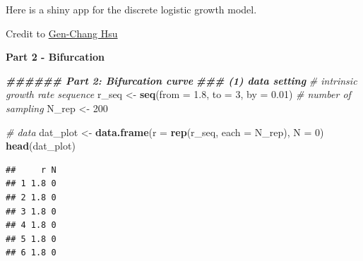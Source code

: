 \documentclass[
]{book}
\newenvironment{Shaded}{\begin{snugshade}}{\end{snugshade}}
\newcommand{\AttributeTok}[1]{\textcolor[rgb]{0.13,0.29,0.53}{#1}}
\newcommand{\CommentTok}[1]{\textcolor[rgb]{0.56,0.35,0.01}{\textit{#1}}}
\newcommand{\DecValTok}[1]{\textcolor[rgb]{0.00,0.00,0.81}{#1}}
\newcommand{\DocumentationTok}[1]{\textcolor[rgb]{0.56,0.35,0.01}{\textbf{\textit{#1}}}}
\newcommand{\FloatTok}[1]{\textcolor[rgb]{0.00,0.00,0.81}{#1}}
\newcommand{\FunctionTok}[1]{\textcolor[rgb]{0.13,0.29,0.53}{\textbf{#1}}}
\newcommand{\NormalTok}[1]{#1}
\newcommand{\OtherTok}[1]{\textcolor[rgb]{0.56,0.35,0.01}{#1}}
\begin{document}
Here is a shiny app for the discrete logistic growth model.

Credit to \href{https://genchanghsu.github.io/index.html}{Gen-Chang Hsu}

\textbf{Part 2 - Bifurcation}

\begin{Shaded}
\begin{Highlighting}[]
\DocumentationTok{\#\#\#\#\#\# Part 2: Bifurcation curve}
\DocumentationTok{\#\#\# (1) data setting}
\CommentTok{\# intrinsic growth rate sequence}
\NormalTok{r\_seq }\OtherTok{\textless{}{-}} \FunctionTok{seq}\NormalTok{(}\AttributeTok{from =} \FloatTok{1.8}\NormalTok{, }\AttributeTok{to =} \DecValTok{3}\NormalTok{, }\AttributeTok{by =} \FloatTok{0.01}\NormalTok{)}
\CommentTok{\# number of sampling}
\NormalTok{N\_rep }\OtherTok{\textless{}{-}} \DecValTok{200}

\CommentTok{\# data }
\NormalTok{dat\_plot }\OtherTok{\textless{}{-}} \FunctionTok{data.frame}\NormalTok{(}\AttributeTok{r =} \FunctionTok{rep}\NormalTok{(r\_seq, }\AttributeTok{each =}\NormalTok{ N\_rep), }\AttributeTok{N =} \DecValTok{0}\NormalTok{)}
\FunctionTok{head}\NormalTok{(dat\_plot)}
\end{Highlighting}
\end{Shaded}

\begin{verbatim}
##     r N
## 1 1.8 0
## 2 1.8 0
## 3 1.8 0
## 4 1.8 0
## 5 1.8 0
## 6 1.8 0
\end{verbatim}
\end{document}
